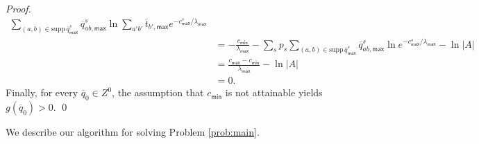 \documentclass[smallextended,referee,envcountsect,]{svjour3}
\newcommand{\supp}{\mathrm{supp}\,}
\begin{document}
\begin{proof}
\begin{align*}
\sum_{(a,b)\in \supp 
\overline{q}_{\mathsf{max}}^s}\overline{q}_{ab,\mathsf{max}}^s \ln  
\sum_{a'b'}\overline{t}_{b',\mathsf{max}} e^{- 
c^s_{\mathsf{max}}/{\lambda_{\mathsf{max}}} } \\
&=- \frac{c_{\mathsf{min}}}{\lambda_{\mathsf{max}}}    -  \sum_s p_s 
\sum_{(a,b)\in \supp 
\overline{q}_{\mathsf{max}}^s}\overline{q}_{ab,\mathsf{max}}^s \ln  
e^{- c^s_{\mathsf{max}}/{\lambda_{\mathsf{max}}} }  - \ln |A|\\
&=  \frac{c_{\mathsf{max}} - 
c_{\mathsf{min}}}{\lambda_{\mathsf{max}}}   - \ln |A|\\
&=0.
\end{align*}
Finally, for every $\overline{q}_{0}\in 
Z^{0}$, the assumption that $c_{\mathsf{min}}$ is not attainable 
yields 
$g(\overline{q}_{0})>0$. \qed
\end{proof}

We describe our algorithm for solving Problem \ref{prob:main}.
\end{document}
